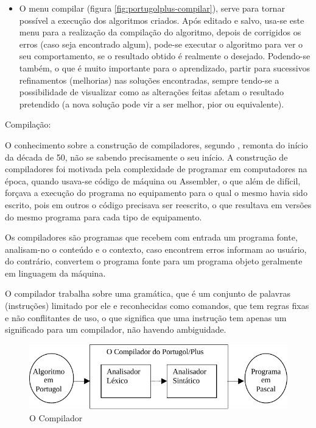 \begin{enumerate}
\begin{itemize}
  \item O menu compilar (figura \ref{fig:portugolplus-compilar}), serve para
  tornar possível a execução dos algoritmos criados. Após editado e salvo,
  usa-se este menu para a realização da compilação do algoritmo, depois de
  corrigidos os erros (caso seja encontrado algum), pode-se executar o algoritmo
  para ver o seu comportamento, se o resultado obtido é realmente o desejado.
  Podendo-se também, o que é muito importante para o aprendizado, partir para
  sucessivos refinamentos (melhorias) nas soluções encontradas, sempre tendo-se
  a possibilidade de visualizar como as alterações feitas afetam o resultado
  pretendido (a nova solução pode vir a ser melhor, pior ou equivalente).

\end{itemize}

  {\bfseries\item Compilação:}

O conhecimento sobre a construção de compiladores, segundo
\cite{ahoetal1995,joseneto1987}, remonta do início da década de 50, não se
sabendo precisamente o seu início. A construção de compiladores foi motivada
pela complexidade de programar em computadores na época, quando usava-se código
de máquina ou Assembler, o que  além de difícil, forçava a execução do programa
no equipamento para o qual o mesmo havia sido escrito, pois em outros o código
precisava ser reescrito, o que resultava em versões do mesmo programa para cada
tipo de equipamento.

Os compiladores são programas que recebem com entrada um programa fonte,
analisam-no o conteúdo e o contexto, caso encontrem erros informam ao usuário,
do contrário, convertem o programa fonte para um programa objeto geralmente em
linguagem da máquina.

O compilador trabalha sobre uma gramática, que é um conjunto de palavras
(instruções) limitado por ele e reconhecidas como comandos, que tem regras fixas
e não conflitantes de uso, o que significa que uma instrução tem apenas um
significado para um compilador, não havendo ambiguidade.

  \begin{figure}[h]
    \centering
    \includegraphics{figures/portugolplus-compilador.pdf}
    \caption{O Compilador}\label{fig:portugolplus-compilador}
  \end{figure}


\end{enumerate}
